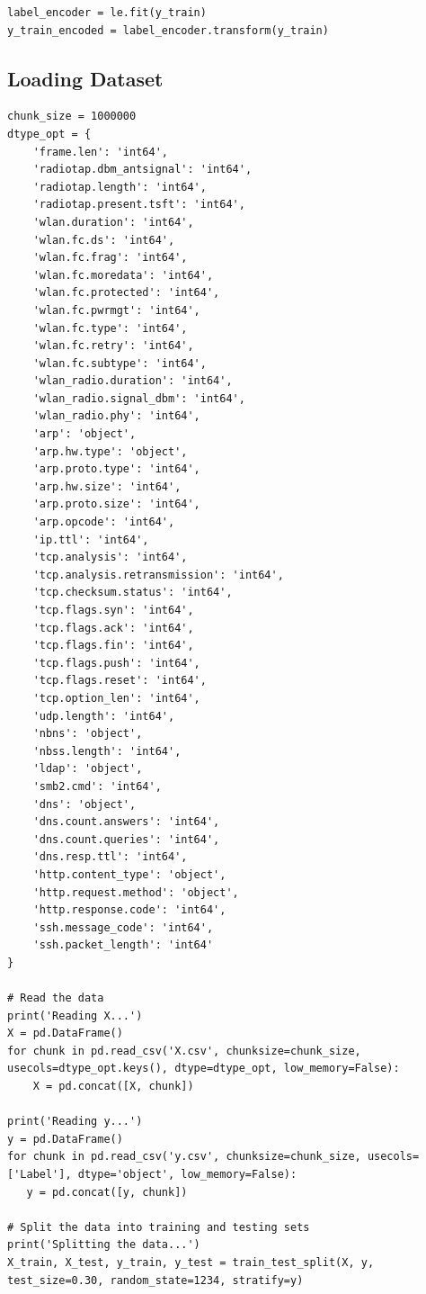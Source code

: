 \begin{appendices}
\begin{lstlisting}
label_encoder = le.fit(y_train)
y_train_encoded = label_encoder.transform(y_train)
\end{lstlisting}

\subsection{Loading Dataset}
\label{appx:Loading Dataset}
\begin{lstlisting}
chunk_size = 1000000
dtype_opt = {
    'frame.len': 'int64',
    'radiotap.dbm_antsignal': 'int64',
    'radiotap.length': 'int64',
    'radiotap.present.tsft': 'int64',
    'wlan.duration': 'int64',
    'wlan.fc.ds': 'int64',
    'wlan.fc.frag': 'int64',
    'wlan.fc.moredata': 'int64',
    'wlan.fc.protected': 'int64',
    'wlan.fc.pwrmgt': 'int64',
    'wlan.fc.type': 'int64',
    'wlan.fc.retry': 'int64',
    'wlan.fc.subtype': 'int64',
    'wlan_radio.duration': 'int64',
    'wlan_radio.signal_dbm': 'int64',
    'wlan_radio.phy': 'int64',
    'arp': 'object',
    'arp.hw.type': 'object',
    'arp.proto.type': 'int64',
    'arp.hw.size': 'int64',
    'arp.proto.size': 'int64',
    'arp.opcode': 'int64',
    'ip.ttl': 'int64',
    'tcp.analysis': 'int64',
    'tcp.analysis.retransmission': 'int64',
    'tcp.checksum.status': 'int64',
    'tcp.flags.syn': 'int64',
    'tcp.flags.ack': 'int64',
    'tcp.flags.fin': 'int64',
    'tcp.flags.push': 'int64',
    'tcp.flags.reset': 'int64',
    'tcp.option_len': 'int64',
    'udp.length': 'int64',
    'nbns': 'object',
    'nbss.length': 'int64',
    'ldap': 'object',
    'smb2.cmd': 'int64',
    'dns': 'object',
    'dns.count.answers': 'int64',
    'dns.count.queries': 'int64',
    'dns.resp.ttl': 'int64',
    'http.content_type': 'object',
    'http.request.method': 'object',
    'http.response.code': 'int64',
    'ssh.message_code': 'int64',
    'ssh.packet_length': 'int64'
}

# Read the data
print('Reading X...')
X = pd.DataFrame()
for chunk in pd.read_csv('X.csv', chunksize=chunk_size, usecols=dtype_opt.keys(), dtype=dtype_opt, low_memory=False):
    X = pd.concat([X, chunk])

print('Reading y...')
y = pd.DataFrame()
for chunk in pd.read_csv('y.csv', chunksize=chunk_size, usecols=['Label'], dtype='object', low_memory=False):
   y = pd.concat([y, chunk])

# Split the data into training and testing sets
print('Splitting the data...')
X_train, X_test, y_train, y_test = train_test_split(X, y, test_size=0.30, random_state=1234, stratify=y)
\end{lstlisting}


\end{appendices}
